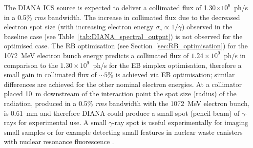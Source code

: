 \documentclass[../main.tex]{subfiles}
\begin{document}
The DIANA ICS source is expected to deliver a collimated flux of 1.30$\times 10^{9}$~ph/\si{\second} in a 0.5\% \textit{rms} bandwidth. The increase in collimated flux due to the decreased electron spot size (with increasing electron energy $\sigma_{e} \propto 1/\gamma$) observed in the baseline case (see Table~\ref{tab:DIANA_spectral_output}) is not observed for the optimised case. The RB optimisation (see Section~\ref{sec:RB_optimisation}) for the 1072~\si{\mega\electronvolt} electron bunch energy predicts a collimated flux of $1.24\times 10^{9}$~ph/\si{\second} in comparison to the $1.30\times 10^{9}$~ph/\si{\second} for the EB simplex optimisation, therefore a small gain in collimated flux of $\sim5$\% is achieved via EB optimisation; similar differences are achieved for the other nominal electron energies. At a collimator placed 10~\si{\meter} downstream of the interaction point the spot size (radius) of the radiation, produced in a 0.5\% \textit{rms} bandwidth with the 1072~\si{\mega\electronvolt} electron bunch, is 0.61~\si{\milli\meter} and therefore DIANA could produce a small spot (pencil beam) of $\gamma$-rays for experimental use. A small $\gamma$-ray spot is useful experimentally for imaging small samples or for example detecting small features in nuclear waste canisters with nuclear resonance fluorescence \cite{angell2015demonstration}.
\end{document}
